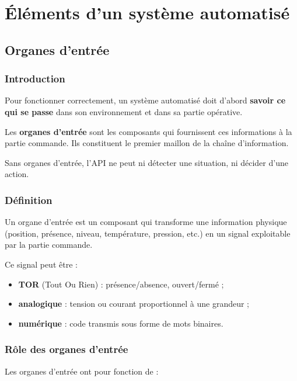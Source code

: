 \chapter{Éléments d'un système automatisé}

\section{Organes d'entrée}

\subsection{Introduction}

Pour fonctionner correctement, un système automatisé doit d'abord \textbf{savoir ce qui se passe} dans son environnement et dans sa partie opérative.

Les \textbf{organes d'entrée} sont les composants qui fournissent ces informations à la partie commande. Ils constituent le premier maillon de la chaîne d'information.

Sans organes d'entrée, l'API ne peut ni détecter une situation, ni décider d'une action.

\subsection{Définition}

Un organe d'entrée est un composant qui transforme une information physique (position, présence, niveau, température, pression, etc.) en un signal exploitable par la partie commande.

Ce signal peut être :

\begin{itemize}
    \item \textbf{TOR} (Tout Ou Rien) : présence/absence, ouvert/fermé ;
    \item \textbf{analogique} : tension ou courant proportionnel à une grandeur ;
    \item \textbf{numérique} : code transmis sous forme de mots binaires.
\end{itemize}

\subsection{Rôle des organes d'entrée}

Les organes d'entrée ont pour fonction de :

